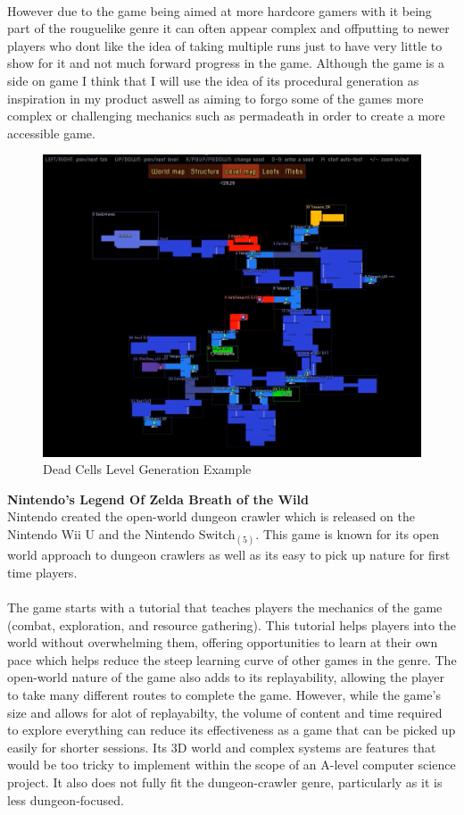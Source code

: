 \documentclass{article}
\begin{document}
        \\
        However due to the game being aimed at more hardcore gamers with it being part of the rouguelike genre it can often appear complex and offputting to newer players who dont like the idea of taking multiple runs just to have very little to show for it and not much forward progress in the game. Although the game is a side on game I think that I will use the idea of its procedural generation as inspiration in my product aswell as aiming to forgo some of the games more complex or challenging mechanics such as permadeath in order to create a more accessible game.\\
        \begin{figure}[H]
                \centering
                \includegraphics[width = 0.8\columnwidth]{images/research/Dead_Cells_level_gen.PNG}
                \caption{Dead Cells Level Generation Example}
        \end{figure}
        \newpage
        \[\]
        \textbf{Nintendo's Legend Of Zelda Breath of the Wild}\\
        Nintendo created the open-world dungeon crawler which is released on the Nintendo Wii U and the Nintendo Switch$_{(5)}$. This game is known for its open world approach to dungeon crawlers as well as its easy to pick up nature for first time players.\\
        \\
        The game starts with a tutorial that teaches players the mechanics of the game (combat, exploration, and resource gathering). This tutorial helps players into the world without overwhelming them, offering opportunities to learn at their own pace which helps reduce the steep learning curve of other games in the genre. The open-world nature of the game also adds to its replayability, allowing the player to take many different routes to complete the game. However, while the game’s size and allows for alot of replayabilty, the volume of content and time required to explore everything can reduce its effectiveness as a game that can be picked up easily for shorter sessions. Its 3D world and complex systems are features that would be too tricky to implement within the scope of an A-level computer science project. It also does not fully fit the dungeon-crawler genre, particularly as it is less dungeon-focused.\\ 
\end{document}
